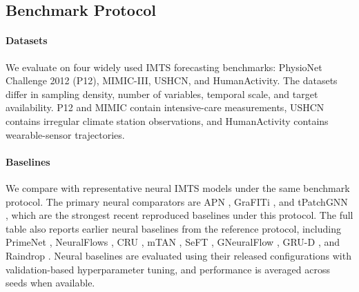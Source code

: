 \documentclass[preprint,12pt]{elsarticle}
\begin{document}

\subsection{Benchmark Protocol}
\label{sec:protocol}

\paragraph{Datasets}
We evaluate on four widely used IMTS forecasting benchmarks: PhysioNet Challenge
2012 (P12), MIMIC-III, USHCN, and HumanActivity. The datasets differ in
sampling density, number of variables, temporal scale, and target availability.
P12 and MIMIC contain intensive-care measurements, USHCN contains irregular
climate station observations, and HumanActivity contains wearable-sensor
trajectories.

\paragraph{Baselines}
We compare \method{} with representative neural IMTS models under the same
benchmark protocol. The primary neural comparators are APN \citep{apn},
GraFITi \citep{grafiti}, and tPatchGNN \citep{tPatchGNN}, which are the
strongest recent reproduced baselines under this protocol. The full table also
reports earlier neural baselines from the reference protocol, including
PrimeNet \citep{primenet}, NeuralFlows \citep{neuralflows2}, CRU \citep{cru},
mTAN \citep{mtan}, SeFT \citep{seft}, GNeuralFlow \citep{gneuralflow}, GRU-D
\citep{grud}, and Raindrop \citep{raindrop2}. Neural baselines are evaluated
using their released configurations with validation-based hyperparameter tuning,
and performance is averaged across seeds when available.
\end{document}
